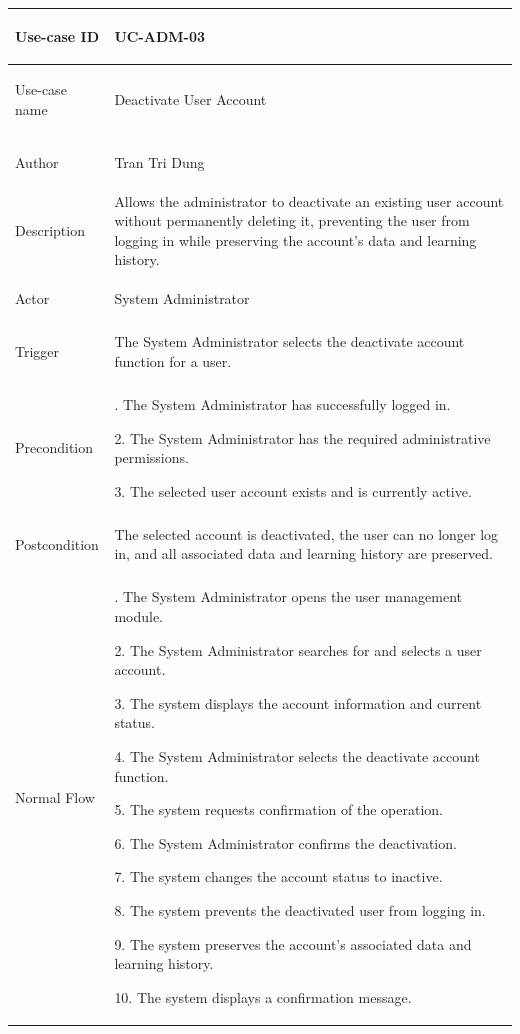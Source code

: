 \begin{longtable}{|>{\bfseries\raggedright\arraybackslash}p{}|>{\raggedright\arraybackslash}p{}|}
\hline
Use-case ID & UC-ADM-03 \\ \hline
Use-case name & Deactivate User Account \\ \hline
Author & Tran Tri Dung \\ \hline
Description & Allows the administrator to deactivate an existing user account without permanently deleting it, preventing the user from logging in while preserving the account's data and learning history. \\ \hline
Actor & System Administrator \\ \hline
Trigger & The System Administrator selects the deactivate account function for a user. \\ \hline
Precondition &
1. The System Administrator has successfully logged in. \par
2. The System Administrator has the required administrative permissions. \par
3. The selected user account exists and is currently active. \\ \hline
Postcondition & The selected account is deactivated, the user can no longer log in, and all associated data and learning history are preserved. \\ \hline
Normal Flow &
1. The System Administrator opens the user management module. \par
2. The System Administrator searches for and selects a user account. \par
3. The system displays the account information and current status. \par
4. The System Administrator selects the deactivate account function. \par
5. The system requests confirmation of the operation. \par
6. The System Administrator confirms the deactivation. \par
7. The system changes the account status to inactive. \par
8. The system prevents the deactivated user from logging in. \par
9. The system preserves the account's associated data and learning history. \par
10. The system displays a confirmation message. \\ \hline

\end{longtable}
